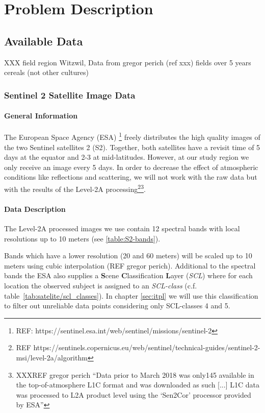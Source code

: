 \chapter{Problem Description}

\section{Available Data}
	{
		XXX field region Witzwil, Data from gregor perich (ref xxx)
		fields over 5 years 
		cereals (not other cultures)
	}

	\subsection{Sentinel 2 Satellite Image Data}{
		\subsubsection*{General Information}{
			The European Space Agency (ESA) \footnote{REF: https://sentinel.esa.int/web/sentinel/missions/sentinel-2} freely distributes the high quality images of the two Sentinel satellites 2 (S2). Together, both satellites have a revisit time of 5 days at the equator and 2-3 at mid-latitudes. However, at our study region we only receive an image every 5 days.
			In order to decrease the effect of atmospheric conditions like reflections and scattering, we will not work with the raw data but with the results of the Level-2A processing\footnote{REF https://sentinels.copernicus.eu/web/sentinel/technical-guides/sentinel-2-msi/level-2a/algorithm}\footnote{XXXREF gregor perich ``Data prior to March 2018 was only145
			available in the top-of-atmosphere L1C format and was downloaded as such [...] L1C data was processed to L2A product level using the `Sen2Cor' processor provided by ESA''}. 
		}

		\subsubsection*{Data Description}{
			The Level-2A processed images we use contain 12 spectral bands with local resolutions up to 10 meters (see \ref{table:S2-bands}).   
			
			Bands which have a lower resolution (20 and 60 meters) will be scaled up to 10 meters using cubic interpolation (REF gregor perich).
			Additional to the spectral bands the ESA also supplies a \textbf{S}cene \textbf{C}lassification \textbf{L}ayer (\textit{SCL}) where for each location the observed subject is assigned to an \textit{SCL-class} (c.f. table~\ref{tab:satelite/scl_classes}). In chapter \ref{sec:itpl}  we will use this classification to filter out unreliable data points considering only SCL-classes 4 and 5.  
			
}}

